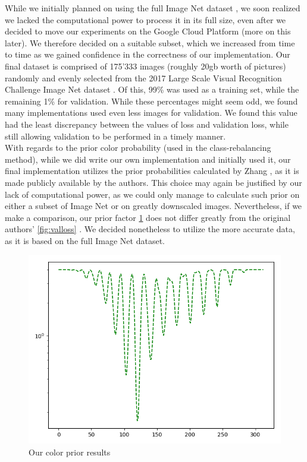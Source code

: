 \documentclass[twoside,twocolumn]{article}
\begin{document}
While we initially planned on using the full Image Net dataset \cite{Imagenet}, we soon realized we lacked the computational power to process it in its full size, even after we decided to move our experiments on the Google Cloud Platform \cite{GCP} (more on this later). We therefore decided on a suitable subset, which we increased from time to time as we gained confidence in the correctness of our implementation. Our final dataset is comprised of 175’333 images (roughly 20gb worth of pictures) randomly and evenly selected from the 2017 Large Scale Visual Recognition Challenge Image Net dataset \cite{ImNetChallenge:2017}. Of this, 99\% was used as a training set, while the remaining 1\% for validation. While these percentages might seem odd, we found many implementations used even less images for validation. We found this value had the least discrepancy between the values of loss and validation loss, while still allowing validation to be performed in a timely manner.\\
With regards to the prior color probability (used in the class-rebalancing method), while we did write our own implementation and initially used it, our final implementation utilizes the prior probabilities calculated by Zhang \cite{Zhang:2016}, as it is made publicly available by the authors. This choice may again be justified by our lack of computational power, as we could only manage to calculate such prior on either a subset of Image Net or on greatly downscaled images. Nevertheless, if we make a comparison, our prior factor \ref{fig:oursprior} does not differ greatly from the original authors’ \ref{fig:valloss} . We decided nonetheless to utilize the more accurate data, as it is based on the full Image Net dataset.

\newpage

\begin{figure}[h]
	\includegraphics[width=\linewidth]{img/ours.png}
	\caption{Our color prior results}
	\label{fig:oursprior}
\end{figure}
\end{document}

